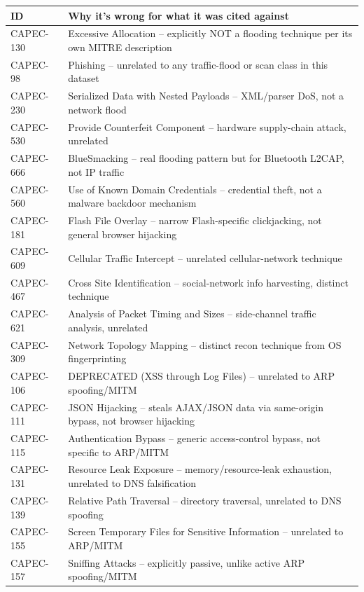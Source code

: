 \documentclass[10pt,twocolumn]{article}
\begin{document}
\begin{longtable}{p{}p{}}
\toprule
ID & Why it's wrong for what it was cited against \\
\midrule
\endhead
CAPEC-130 & Excessive Allocation -- explicitly NOT a flooding technique per its own MITRE description \\
CAPEC-98 & Phishing -- unrelated to any traffic-flood or scan class in this dataset \\
CAPEC-230 & Serialized Data with Nested Payloads -- XML/parser DoS, not a network flood \\
CAPEC-530 & Provide Counterfeit Component -- hardware supply-chain attack, unrelated \\
CAPEC-666 & BlueSmacking -- real flooding pattern but for Bluetooth L2CAP, not IP traffic \\
CAPEC-560 & Use of Known Domain Credentials -- credential theft, not a malware backdoor mechanism \\
CAPEC-181 & Flash File Overlay -- narrow Flash-specific clickjacking, not general browser hijacking \\
CAPEC-609 & Cellular Traffic Intercept -- unrelated cellular-network technique \\
CAPEC-467 & Cross Site Identification -- social-network info harvesting, distinct technique \\
CAPEC-621 & Analysis of Packet Timing and Sizes -- side-channel traffic analysis, unrelated \\
CAPEC-309 & Network Topology Mapping -- distinct recon technique from OS fingerprinting \\
CAPEC-106 & DEPRECATED (XSS through Log Files) -- unrelated to ARP spoofing/MITM \\
CAPEC-111 & JSON Hijacking -- steals AJAX/JSON data via same-origin bypass, not browser hijacking \\
CAPEC-115 & Authentication Bypass -- generic access-control bypass, not specific to ARP/MITM \\
CAPEC-131 & Resource Leak Exposure -- memory/resource-leak exhaustion, unrelated to DNS falsification \\
CAPEC-139 & Relative Path Traversal -- directory traversal, unrelated to DNS spoofing \\
CAPEC-155 & Screen Temporary Files for Sensitive Information -- unrelated to ARP/MITM \\
CAPEC-157 & Sniffing Attacks -- explicitly passive, unlike active ARP spoofing/MITM \\

\end{longtable}
\end{document}
